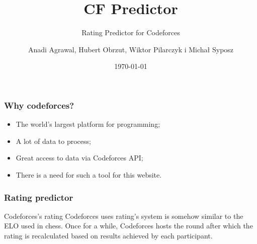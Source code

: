 \documentclass{beamer}
\title[Machine Learning]{CF Predictor}
\subtitle{Rating Predictor for Codeforces}
\author[CF Predictor]{Anadi Agrawal, Hubert Obrzut, Wiktor Pilarczyk i Michał Syposz}
\institute{Uniwersytet Wrocławski}
\date{\today}
\begin{document}
\begin{frame}
\titlepage
\end{frame}



\begin{frame}
\frametitle{Why codeforces?}

\begin{itemize}
	\item<1-> The world's largest platform for programming;
	\item<2-> A lot of data to process;
	\item<3-> Great access to data via Codeforces API;
	\item<4-> There is a need for such a tool for this website.
\end{itemize}

\end{frame}





\begin{frame}
\frametitle{Rating predictor}

\begin{exampleblock}{Codeforces's rating}
Codeforces uses rating's system is somehow similar to the ELO used in chess. 
Once for a while, Codeforces hosts the round after which the rating is recalculated based on results achieved by each participant.
\end{exampleblock}


\end{frame}
\end{document}
